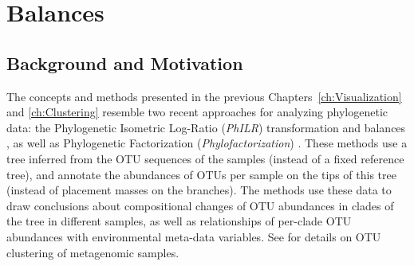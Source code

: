 
\chapter{Balances}
\label{ch:Balances}




\section{Background and Motivation}
\label{ch:Balances:sec:Motivation}



The concepts and methods presented in the previous Chapters~\ref{ch:Visualization} and \ref{ch:Clustering}
resemble two recent approaches for analyzing phylogenetic data:
the Phylogenetic Isometric Log-Ratio (\emph{PhILR}) transformation and balances \cite{Silverman2017},
as well as Phylogenetic Factorization (\emph{Phylofactorization}) \cite{Washburne2017a}.
These methods use a tree inferred from the OTU sequences of the samples (instead of a fixed reference tree),
and annotate the abundances of OTUs per sample on the tips of this tree (instead of placement masses on the branches).
The methods use these data to draw conclusions about compositional changes of OTU abundances in clades of the tree in different samples,
as well as relationships of per-clade OTU abundances with environmental meta-data variables.
See  for details on OTU clustering of metagenomic samples.

